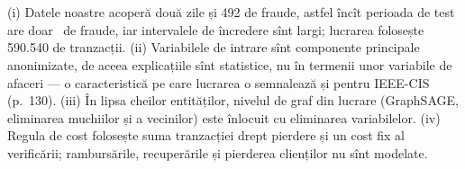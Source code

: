 \section{}
%
{(i) Datele noastre acoperă două zile și 492 de fraude, astfel încît perioada de test are doar \NnTestFraud\ de fraude, iar intervalele de încredere sînt largi; lucrarea folosește 590.540 de tranzacții. (ii) Variabilele de intrare sînt componente principale anonimizate, de aceea explicațiile sînt statistice, nu în termenii unor variabile de afaceri --- o caracteristică pe care lucrarea o semnalează și pentru IEEE-CIS (p.~130).
(iii) În lipsa cheilor entităților, nivelul de graf din lucrare (GraphSAGE, eliminarea muchiilor și a vecinilor) este înlocuit cu eliminarea variabilelor. (iv) Regula de cost folosește suma tranzacției drept pierdere și un cost fix al verificării; rambursările, recuperările și pierderea clienților nu sînt modelate.}

\newpage
